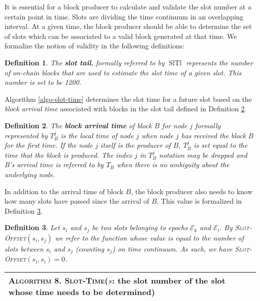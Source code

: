 \documentclass{book}
\newcommand{\tmem}[1]{{\em #1\/}}
\newcommand{\tmname}[1]{\textsc{#1}}
\newcommand{\tmop}[1]{\ensuremath{\operatorname{#1}}}
\newcommand{\tmstrong}[1]{\textbf{#1}}
\newcommand{\tmtextbf}[1]{{\bfseries{#1}}}
\newcommand{\tmtextit}[1]{{\itshape{#1}}}
\newcommand{\tmtextsc}[1]{{\scshape{#1}}}
\newcommand{\tmtexttt}[1]{{\ttfamily{#1}}}
\newcommand{\tmverbatim}[1]{{\ttfamily{#1}}}
\newcounter{tmcounter}
\newcommand{\custombinding}[1]{%
  \setcounter{tmcounter}{#1}%
  \addtocounter{tmcounter}{-1}%
  \refstepcounter{tmcounter}}
\newtheorem{definition}{Definition}
\providecommand{\tmem}[1]{\tmtextit{#1}}
\providecommand{\tmname}[1]{\tmtextsc{#1}}
\providecommand{\tmop}[1]{\ensuremath{\mathrm{#1}}}
\providecommand{\tmstrong}[1]{\tmtextbf{#1}}
\providecommand{\tmtextbf}[1]{\tmtextbf{#1}}
\providecommand{\tmtextit}[1]{\tmtextit{#1}}
\providecommand{\tmverbatim}[1]{\tmtexttt{#1}}
\newtheorem{definition}{Definition}
\begin{document}
It is essential for a block producer to calculate and validate the slot number
at a certain point in time. Slots are dividing the time continuum in an
overlapping interval. At a given time, the block producer should be able to
determine the set of slots which can be associated to a valid block generated
at that time. We formalize the notion of validity in the following
definitions:

\begin{definition}
  \label{slot-time-cal-tail}The {\tmstrong{slot tail}}, formally referred to
  by $\tmop{SlTl}$ represents the number of on-chain blocks that are used to
  estimate the slot time of a given slot. This number is set to be 1200.
\end{definition}

Algorithm \ref{algo-slot-time} determines the slot time for a future slot
based on the {\tmem{block arrival time}} associated with blocks in the slot
tail defined in Definition \ref{defn-block-time}.

\begin{definition}
  \label{defn-block-time}The {\tmstrong{block arrival time}} of block $B$ for
  node $j$ formally represented by {\tmstrong{$T^j_B$}} is the local time
  of\tmverbatim{} node $j$ when node $j$ has received the block $B$ for the
  first time. If the node $j$ itself is the producer of $B$, $T_B^j$ is set
  equal to the time that the block is produced. The index $j$ in $T^j_B$
  notation may be dropped and B's arrival time is referred to by $T_B$ when
  there is no ambiguity about the underlying node.
\end{definition}

In addition to the arrival time of block $B$, the block producer also needs to
know how many slots have passed since the arrival of $B$. This value is
formalized in Definition \ref{defn-slot-offset}.

\begin{definition}
  \label{defn-slot-offset}Let $s_i$ and $s_j$ be two slots belonging to epochs
  $\mathcal{E}_k$ and $\mathcal{E}_l$. By {\tmname{Slot-Offset}}$(s_i, s_j)$
  we refer to the function whose value is equal to the number of slots between
  $s_i$ and $s_j$ (counting $s_j$) on time continuum. As such, we have
  {\tmname{Slot-Offset}}$(s_i, s_i) = 0$.
\end{definition}

\custombinding{8}{\noindent}\begin{tabular}{l}
  \hline
  \tmtextsc{Algorithm  8. } \label{algo-slot-time}{\tmname{Slot-Time}}($s$:
  the slot number of the slot whose time needs to be determined)\\
  \hline
\end{tabular}
\end{document}
